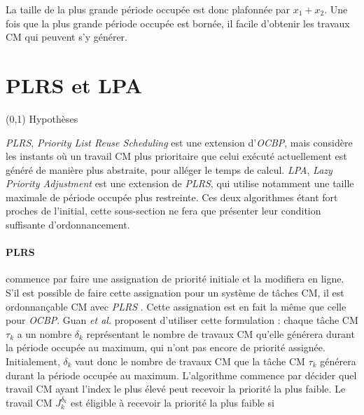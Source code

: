 \documentclass[12pt,a4paper,oneside]{book}
\theoremstyle{break}
\theoremstyle{breakplain}
\begin{document}
La taille de la plus grande période occupée est donc plafonnée par $x_1+x_2$. Une fois que la plus grande période occupée est bornée, il facile d'obtenir les travaux CM qui peuvent s'y générer.

\section{PLRS et LPA}

\label{plrslpa}

\begin{center}
\boxput*(0,1){
\colorbox{white}{Hypothèses}
}{
\setlength{\fboxsep}{6pt}
}
\end{center}

\textit{PLRS}, \textit{Priority List Reuse Scheduling} est une extension d'\textit{OCBP}, mais considère les instants où un travail CM plus prioritaire que celui exécuté actuellement est généré de manière plus abstraite, pour alléger le temps de calcul. \textit{LPA}, \textit{Lazy Priority Adjustment} est une extension de \textit{PLRS}, qui utilise notamment une taille maximale de période occupée plus restreinte. Ces deux algorithmes étant fort proches de l'initial, cette sous-section ne fera que présenter leur condition suffisante d'ordonnancement.

\pagebreak

\paragraph{PLRS} commence par faire une assignation de priorité initiale et la modifiera en ligne. S'il est possible de faire cette assignation pour un système de tâches CM, il est ordonnançable CM avec \textit{PLRS} \cite{guan2011effective}. Cette assignation est en fait la même que celle pour \textit{OCBP}. Guan \textit{et al.} proposent d'utiliser cette formulation : chaque tâche CM $\tau_k$ a un nombre $\delta_k$ représentant le nombre de travaux CM qu'elle générera durant la période occupée au maximum, qui n'ont pas encore de priorité assignée. Initialement, $\delta_k$ vaut donc le nombre de travaux CM que la tâche CM $\tau_k$ générera durant la période occupée au maximum. L'algorithme commence par décider quel travail CM ayant l'index le plus élevé peut recevoir la priorité la plus faible. Le travail CM $J^{\delta_k}_k$ est éligible à recevoir la priorité la plus faible si
\end{document}
